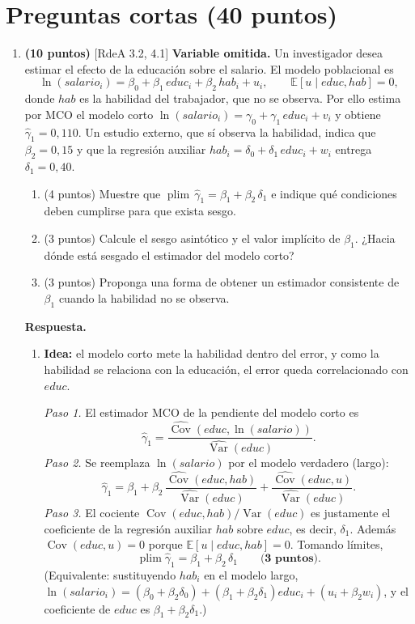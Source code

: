 \documentclass[12pt,letterpaper]{article}
\newcommand{\E}[1]{\mathbb{E}\left[#1\right]}
\newcommand{\rdea}[1]{\textsf{\small [RdeA #1]}}
\DeclareMathOperator{\cov}{Cov}
\DeclareMathOperator{\var}{Var}
\DeclareMathOperator{\plim}{plim}
\newcommand{\sol}{\color{blue}}
\begin{document}
\section{Preguntas cortas (40 puntos)}
\begin{enumerate}

\item \textbf{(10 puntos)} \rdea{3.2, 4.1} \textbf{Variable omitida.} Un investigador desea estimar el efecto de la educación sobre el salario. El modelo poblacional es
\[
\ln(salario_i)=\beta_0+\beta_1\,educ_i+\beta_2\,hab_i+u_i,\qquad \E{u\mid educ,hab}=0,
\]
donde $hab$ es la habilidad del trabajador, que no se observa. Por ello estima por MCO el modelo corto $\ln(salario_i)=\gamma_0+\gamma_1\,educ_i+v_i$ y obtiene $\hat\gamma_1=0{,}110$. Un estudio externo, que sí observa la habilidad, indica que $\beta_2=0{,}15$ y que la regresión auxiliar $hab_i=\delta_0+\delta_1\,educ_i+w_i$ entrega $\delta_1=0{,}40$.

\begin{enumerate}[label=\alph*)]
    \item (4 puntos) Muestre que $\plim\,\hat\gamma_1=\beta_1+\beta_2\,\delta_1$ e indique qué condiciones deben cumplirse para que exista sesgo.
    \item (3 puntos) Calcule el sesgo asintótico y el valor implícito de $\beta_1$. ¿Hacia dónde está sesgado el estimador del modelo corto?
    \item (3 puntos) Proponga una forma de obtener un estimador consistente de $\beta_1$ cuando la habilidad no se observa.
\end{enumerate}

{\sol
\textbf{Respuesta.}
\begin{enumerate}[label=\alph*)]
    \item \textbf{Idea:} el modelo corto mete la habilidad dentro del error, y como la habilidad se relaciona con la educación, el error queda correlacionado con $educ$.

    \textit{Paso 1.} El estimador MCO de la pendiente del modelo corto es
    \[
        \hat\gamma_1=\frac{\widehat{\cov}(educ,\ln(salario))}{\widehat{\var}(educ)} .
    \]
    \textit{Paso 2.} Se reemplaza $\ln(salario)$ por el modelo verdadero (largo):
    \[
        \hat\gamma_1=\beta_1+\beta_2\,\frac{\widehat{\cov}(educ,hab)}{\widehat{\var}(educ)}+\frac{\widehat{\cov}(educ,u)}{\widehat{\var}(educ)} .
    \]
    \textit{Paso 3.} El cociente $\cov(educ,hab)/\var(educ)$ es justamente el coeficiente de la regresión auxiliar $hab$ sobre $educ$, es decir, $\delta_1$. Además $\cov(educ,u)=0$ porque $\E{u\mid educ,hab}=0$. Tomando límites,
    \[
        \plim\hat\gamma_1=\beta_1+\beta_2\,\delta_1 \qquad\textbf{(3 puntos)}.
    \]
    (Equivalente: sustituyendo $hab_i$ en el modelo largo, $\ln(salario_i)=(\beta_0+\beta_2\delta_0)+(\beta_1+\beta_2\delta_1)educ_i+(u_i+\beta_2w_i)$, y el coeficiente de $educ$ es $\beta_1+\beta_2\delta_1$.)


\end{enumerate}}
\end{enumerate}
\end{document}
